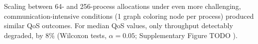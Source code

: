 Scaling between 64- and 256-process allocations under even more challenging, communication-intensive conditions (1 graph coloring node per process) produced similar QoS outcomes.
For median QoS values, only throughput detectably degraded, by 8\% (Wilcoxon tests, $\alpha = 0.05$; Supplementary Figure TODO \cite{moreno_2026_trust}).







